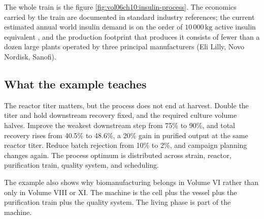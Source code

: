 The whole train is the figure
\cref{fig:vol06ch10:insulin-process}. The economics carried by the
train are documented in standard industry references; the current
estimated annual world insulin demand is on the order of
$10\,000\,\text{kg}$ active insulin equivalent
\cite{paper:v6c10-basu-insulin-access-2019}, and the production
footprint that produces it consists of fewer than a dozen large plants
operated by three principal manufacturers (Eli Lilly, Novo Nordisk,
Sanofi).

\subsection{What the example teaches}

The reactor titer matters, but the process does not end at harvest.
Double the titer and hold downstream recovery fixed, and the required
culture volume halves. Improve the weakest downstream step from 75\% to
90\%, and total recovery rises from 40.5\% to 48.6\%, a 20\% gain in
purified output at the same reactor titer. Reduce batch rejection from
10\% to 2\%, and campaign planning changes again. The process optimum
is distributed across strain, reactor, purification train, quality
system, and scheduling.

The example also shows why biomanufacturing belongs in Volume VI rather
than only in Volume VIII or XI. The machine is the cell plus the vessel
plus the purification train plus the quality system. The living phase is
part of the machine.

